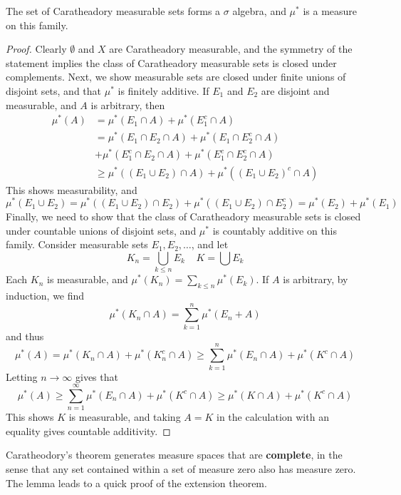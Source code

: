 \begin{lemma}
    The set of Caratheadory measurable sets forms a $\sigma$ algebra, and $\mu^*$ is a measure on this family.
\end{lemma}
\begin{proof}
    Clearly $\emptyset$ and $X$ are Caratheadory measurable, and the symmetry of the statement implies the class of Caratheadory measurable sets is closed under complements. Next, we show measurable sets are closed under finite unions of disjoint sets, and that $\mu^*$ is finitely additive. If $E_1$ and $E_2$ are disjoint and measurable, and $A$ is arbitrary, then
    \begin{align*}
        \mu^*(A) &= \mu^*(E_1 \cap A) + \mu^*(E_1^c \cap A)\\
        &=  \mu^*(E_1 \cap E_2 \cap A) + \mu^*(E_1 \cap E_2^c \cap A)\\
        &+ \mu^*(E_1^c \cap E_2 \cap A) + \mu^*(E_1^c \cap E_2^c \cap A)\\
        &\geq \mu^*((E_1 \cup E_2) \cap A) + \mu^*((E_1 \cup E_2)^c \cap A)
    \end{align*}
    This shows measurability, and
    \[ \mu^*(E_1 \cup E_2) = \mu^*((E_1 \cup E_2) \cap E_2) + \mu^*((E_1 \cup E_2) \cap E_2^c) = \mu^*(E_2) + \mu^*(E_1) \]
    Finally, we need to show that the class of Caratheadory measurable sets is closed under countable unions of disjoint sets, and $\mu^*$ is countably additive on this family. Consider measurable sets $E_1, E_2, \dots$, and let
    \[ K_n = \bigcup_{k \leq n} E_k\ \ \ \ \ K = \bigcup E_k \]
    Each $K_n$ is measurable, and $\mu^*(K_n) = \sum_{k \leq n} \mu^*(E_k)$. If $A$ is arbitrary, by induction, we find
    \[ \mu^*(K_n \cap A) = \sum_{k = 1}^n \mu^*(E_n + A) \]
    and thus
    \[ \mu^*(A) = \mu^*(K_n \cap A) + \mu^*(K_n^c \cap A) \geq \sum_{k = 1}^n \mu^*(E_n \cap A) + \mu^*(K^c \cap A) \]
    Letting $n \to \infty$ gives that
    \[ \mu^*(A) \geq \sum_{n = 1}^\infty \mu^*(E_n \cap A) + \mu^*(K^c \cap A) \geq \mu^*(K \cap A) + \mu^*(K^c \cap A) \]
    This shows $K$ is measurable, and taking $A = K$ in the calculation with an equality gives countable additivity.
\end{proof}

Caratheodory's theorem generates measure spaces that are {\bf complete}, in the sense that any set contained within a set of measure zero also has measure zero. The lemma leads to a quick proof of the extension theorem.

